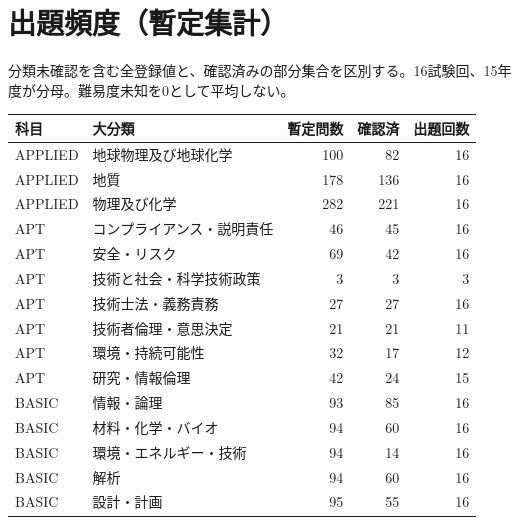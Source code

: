 \chapter{出題頻度（暫定集計）}
分類未確認を含む全登録値と、確認済みの部分集合を区別する。16試験回、15年度が分母。難易度未知を0として平均しない。
\begin{longtable}{p{.16\linewidth}p{.42\linewidth}rrr}
科目 & 大分類 & 暫定問数 & 確認済 & 出題回数\\\hline
APPLIED & 地球物理及び地球化学 & 100 & 82 & 16\\
APPLIED & 地質 & 178 & 136 & 16\\
APPLIED & 物理及び化学 & 282 & 221 & 16\\
APT & コンプライアンス・説明責任 & 46 & 45 & 16\\
APT & 安全・リスク & 69 & 42 & 16\\
APT & 技術と社会・科学技術政策 & 3 & 3 & 3\\
APT & 技術士法・義務責務 & 27 & 27 & 16\\
APT & 技術者倫理・意思決定 & 21 & 21 & 11\\
APT & 環境・持続可能性 & 32 & 17 & 12\\
APT & 研究・情報倫理 & 42 & 24 & 15\\
BASIC & 情報・論理 & 93 & 85 & 16\\
BASIC & 材料・化学・バイオ & 94 & 60 & 16\\
BASIC & 環境・エネルギー・技術 & 94 & 14 & 16\\
BASIC & 解析 & 94 & 60 & 16\\
BASIC & 設計・計画 & 95 & 55 & 16\\
\end{longtable}

